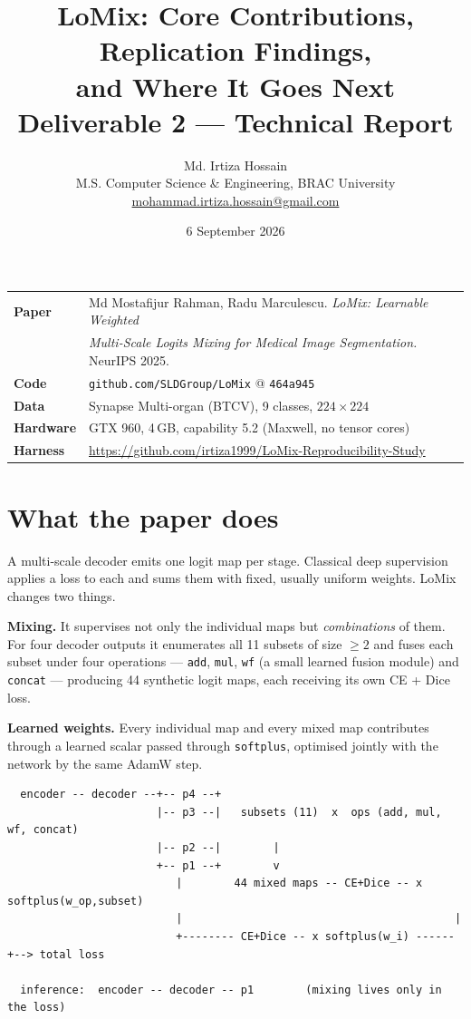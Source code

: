 \documentclass[11pt,a4paper]{article}
\title{\vspace{-2em}\textbf{LoMix: Core Contributions, Replication Findings,}\\
\textbf{and Where It Goes Next}\\[0.4em]
\large Deliverable 2 --- Technical Report}
\author{Md. Irtiza Hossain \\
\small M.S. Computer Science \& Engineering, BRAC University \\
\small \href{mailto:mohammad.irtiza.hossain@gmail.com}{mohammad.irtiza.hossain@gmail.com}}
\date{6 September 2026}
\newcommand{\code}[1]{\texttt{\small #1}}
\begin{document}
\maketitle

\noindent\begin{tabular}{@{}ll@{}}
\textbf{Paper} & Md Mostafijur Rahman, Radu Marculescu. \emph{LoMix: Learnable Weighted} \\
               & \emph{Multi-Scale Logits Mixing for Medical Image Segmentation.} NeurIPS 2025. \\
\textbf{Code}  & \code{github.com/SLDGroup/LoMix} @ \code{464a945} \\
\textbf{Data}  & Synapse Multi-organ (BTCV), 9 classes, $224\times224$ \\
\textbf{Hardware} & GTX 960, 4\,GB, capability 5.2 (Maxwell, no tensor cores) \\
\textbf{Harness} & \url{https://github.com/irtiza1999/LoMix-Reproducibility-Study} \\
\end{tabular}

\vspace{0.6em}

\section{What the paper does}

A multi-scale decoder emits one logit map per stage. Classical deep supervision
applies a loss to each and sums them with fixed, usually uniform weights. LoMix
changes two things.

\textbf{Mixing.} It supervises not only the individual maps but \emph{combinations}
of them. For four decoder outputs it enumerates all 11 subsets of size $\geq 2$
and fuses each subset under four operations --- \code{add}, \code{mul},
\code{wf} (a small learned fusion module) and \code{concat} --- producing 44
synthetic logit maps, each receiving its own CE + Dice loss.

\textbf{Learned weights.} Every individual map and every mixed map contributes
through a learned scalar passed through \code{softplus}, optimised jointly with
the network by the same AdamW step.

\begin{lstlisting}
  encoder -- decoder --+-- p4 --+
                       |-- p3 --|   subsets (11)  x  ops (add, mul, wf, concat)
                       |-- p2 --|        |
                       +-- p1 --+        v
                          |        44 mixed maps -- CE+Dice -- x softplus(w_op,subset)
                          |                                          |
                          +-------- CE+Dice -- x softplus(w_i) ------+--> total loss

  inference:  encoder -- decoder -- p1        (mixing lives only in the loss)
\end{lstlisting}
\end{document}
